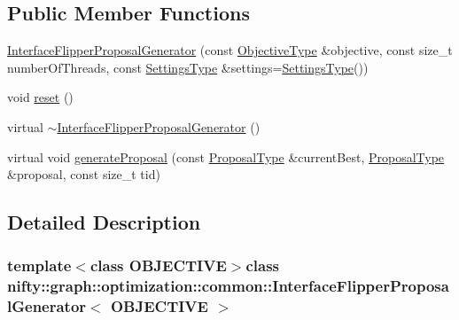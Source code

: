 \subsection*{Public Member Functions}
\begin{DoxyCompactItemize}
\item 
\hyperlink{classnifty_1_1graph_1_1optimization_1_1common_1_1InterfaceFlipperProposalGenerator_a5cc8610f56bc8ff7d94d774682eaa0a2}{Interface\+Flipper\+Proposal\+Generator} (const \hyperlink{classnifty_1_1graph_1_1optimization_1_1common_1_1InterfaceFlipperProposalGenerator_a23d9dca49c7acc58fc6ed4d877ccdfd9}{Objective\+Type} \&objective, const size\+\_\+t number\+Of\+Threads, const \hyperlink{structnifty_1_1graph_1_1optimization_1_1common_1_1InterfaceFlipperProposalGenerator_1_1SettingsType}{Settings\+Type} \&settings=\hyperlink{structnifty_1_1graph_1_1optimization_1_1common_1_1InterfaceFlipperProposalGenerator_1_1SettingsType}{Settings\+Type}())
\item 
void \hyperlink{classnifty_1_1graph_1_1optimization_1_1common_1_1InterfaceFlipperProposalGenerator_a51b2e0bff835205b816039be523b91e0}{reset} ()
\item 
virtual \hyperlink{classnifty_1_1graph_1_1optimization_1_1common_1_1InterfaceFlipperProposalGenerator_a165ba16f08235c56c9e15cdbbe374a6f}{$\sim$\+Interface\+Flipper\+Proposal\+Generator} ()
\item 
virtual void \hyperlink{classnifty_1_1graph_1_1optimization_1_1common_1_1InterfaceFlipperProposalGenerator_ac4f9c13fb3c8d1efb0a1a1584e423994}{generate\+Proposal} (const \hyperlink{classnifty_1_1graph_1_1optimization_1_1common_1_1InterfaceFlipperProposalGenerator_af96c4895cbdc98e624cbece6e15816e1}{Proposal\+Type} \&current\+Best, \hyperlink{classnifty_1_1graph_1_1optimization_1_1common_1_1InterfaceFlipperProposalGenerator_af96c4895cbdc98e624cbece6e15816e1}{Proposal\+Type} \&proposal, const size\+\_\+t tid)
\end{DoxyCompactItemize}


\subsection{Detailed Description}
\subsubsection*{template$<$class O\+B\+J\+E\+C\+T\+I\+V\+E$>$class nifty\+::graph\+::optimization\+::common\+::\+Interface\+Flipper\+Proposal\+Generator$<$ O\+B\+J\+E\+C\+T\+I\+V\+E $>$}

